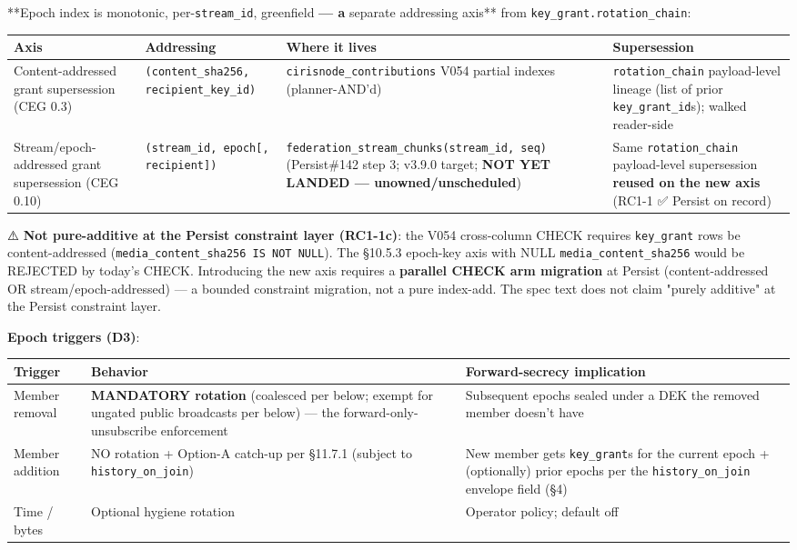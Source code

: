 \documentclass[11pt]{article}
\begin{document}
**Epoch index is monotonic, per-\texttt{stream\_id}, greenfield\textbf{ — a }separate addressing axis** from \texttt{key\_grant.rotation\_chain}:


{\scriptsize
\begin{longtable}{|p{4.0cm}|p{4.0cm}|p{4.0cm}|p{4.0cm}|}\hline
\textbf{Axis} & \textbf{Addressing} & \textbf{Where it lives} & \textbf{Supersession} \\ \hline\endhead
Content-addressed grant supersession (CEG 0.3) & \texttt{(content\_sha256, recipient\_key\_id)} & \texttt{cirisnode\_contributions} V054 partial indexes (planner-AND'd) & \texttt{rotation\_chain} payload-level lineage (list of prior \texttt{key\_grant\_id}s); walked reader-side \\ \hline
Stream/epoch-addressed grant supersession (CEG 0.10) & \texttt{(stream\_id, epoch[, recipient])} & \texttt{federation\_stream\_chunks(stream\_id, seq)} (Persist\#142 step 3; v3.9.0 target; \textbf{NOT YET LANDED — unowned/unscheduled}) & Same \texttt{rotation\_chain} payload-level supersession \textbf{reused on the new axis} (RC1-1 ✅ Persist on record) \\ \hline
\end{longtable}}


⚠️ \textbf{Not pure-additive at the Persist constraint layer (RC1-1c)}: the V054 cross-column CHECK requires \texttt{key\_grant} rows be content-addressed (\texttt{media\_content\_sha256 IS NOT NULL}). The §10.5.3 epoch-key axis with NULL \texttt{media\_content\_sha256} would be REJECTED by today's CHECK. Introducing the new axis requires a \textbf{parallel CHECK arm migration} at Persist (content-addressed OR stream/epoch-addressed) — a bounded constraint migration, not a pure index-add. The spec text does not claim "purely additive" at the Persist constraint layer.


\textbf{Epoch triggers (D3)}:


{\footnotesize
\begin{longtable}{|p{5.33cm}|p{5.33cm}|p{5.33cm}|}\hline
\textbf{Trigger} & \textbf{Behavior} & \textbf{Forward-secrecy implication} \\ \hline\endhead
Member removal & \textbf{MANDATORY rotation} (coalesced per below; exempt for ungated public broadcasts per below) — the forward-only-unsubscribe enforcement & Subsequent epochs sealed under a DEK the removed member doesn't have \\ \hline
Member addition & NO rotation + Option-A catch-up per §11.7.1 (subject to \texttt{history\_on\_join}) & New member gets \texttt{key\_grant}s for the current epoch + (optionally) prior epochs per the \texttt{history\_on\_join} envelope field (§4) \\ \hline
Time / bytes & Optional hygiene rotation & Operator policy; default off \\ \hline
\end{longtable}}
\end{document}
